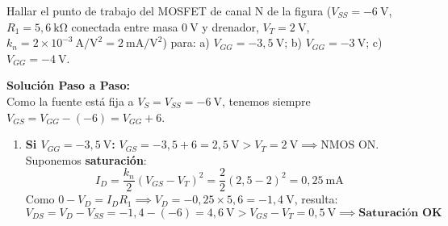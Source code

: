 \begin{ejercicio}
Hallar el punto de trabajo del MOSFET de canal N de la figura ($V_{SS} = -6\ \si{\volt}$, $R_1 = 5{,}6\ \si{\kilo\ohm}$ conectada entre masa $0\ \si{\volt}$ y drenador, $V_T = 2\ \si{\volt}$, $k_n = 2 \times 10^{-3}\ \si{\ampere\per\volt\squared} = 2\ \si{\milli\ampere\per\volt\squared}$) para:
a) $V_{GG} = -3{,}5\ \si{\volt}$; \quad b) $V_{GG} = -3\ \si{\volt}$; \quad c) $V_{GG} = -4\ \si{\volt}$.
\tcbline
\begin{center}
\end{center}
\textbf{Solución Paso a Paso:}\\[4pt]
Como la fuente está fija a $V_S = V_{SS} = -6\ \si{\volt}$, tenemos siempre $V_{GS} = V_{GG} - (-6) = V_{GG} + 6$.
\begin{enumerate}[label=\alph*)]
    \item \textbf{Si $V_{GG} = -3{,}5\ \si{\volt}$:} $V_{GS} = -3{,}5 + 6 = 2{,}5\ \si{\volt} > V_T = 2\ \si{\volt} \implies \text{NMOS ON}$.
    Suponemos \textbf{saturación}:
    \begin{equation}
        I_D = \frac{k_n}{2}(V_{GS} - V_T)^2 = \frac{2}{2}(2{,}5 - 2)^2 = 0{,}25\ \si{\milli\ampere}
    \end{equation}
    Como $0 - V_D = I_D R_1 \implies V_D = -0{,}25 \times 5{,}6 = -1{,}4\ \si{\volt}$, resulta:
    \begin{equation}
        V_{DS} = V_D - V_{SS} = -1{,}4 - (-6) = 4{,}6\ \si{\volt} > V_{GS} - V_T = 0{,}5\ \si{\volt} \implies \textbf{Saturación OK}
    \end{equation}


\end{enumerate}
\end{ejercicio}
